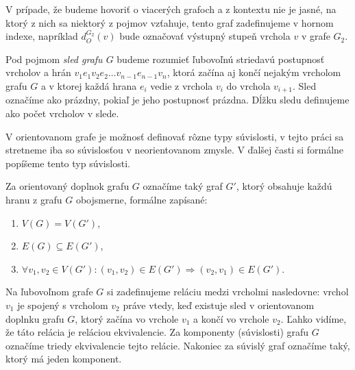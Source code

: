 V prípade, že budeme hovoriť o viacerých grafoch a z kontextu nie je jasné, na ktorý z nich
sa niektorý z pojmov vzťahuje, tento graf zadefinujeme v hornom indexe, napríklad
$d_O^{G_2}(v)$ bude označovať výstupný stupeň vrchola $v$ v grafe $G_2$.

Pod pojmom \emph{sled grafu $G$} budeme rozumieť ľubovoľnú striedavú postupnosť vrcholov
a hrán $v_1 e_1 v_2 e_2 \ldots v_{n-1} e_{n-1} v_n$, ktorá začína aj končí nejakým vrcholom
grafu $G$ a v ktorej každá hrana $e_i$ vedie z vrchola $v_i$ do vrchola $v_{i+1}$. Sled označíme
ako prázdny, pokiaľ je jeho postupnosť prázdna. Dĺžku sledu definujeme ako počet vrcholov v slede.

V orientovanom grafe je možnosť definovať rôzne typy súvislosti, v tejto práci sa stretneme iba
so súvislosťou v neorientovanom zmysle. V ďalšej časti si formálne popíšeme tento typ súvislosti.

Za orientovaný doplnok grafu $G$ označíme taký graf $G'$,
ktorý obsahuje každú hranu z grafu $G$ obojsmerne, formálne zapísané:
\begin{enumerate}
    \item $V(G) = V(G')$,
    \item $E(G) \subseteq E(G')$,
    \item $\forall v_1, v_2 \in V(G') : (v_1, v_2) \in E(G') \Rightarrow (v_2, v_1) \in E(G')$.
\end{enumerate}

Na ľubovoľnom grafe $G$ si zadefinujeme reláciu medzi vrcholmi nasledovne: vrchol $v_1$ je spojený
s vrcholom $v_2$ práve vtedy, keď existuje sled v orientovanom doplnku grafu $G$, ktorý začína vo 
vrchole $v_1$ a končí vo vrchole $v_2$. Ľahko vidíme, že táto relácia je reláciou ekvivalencie.
Za komponenty (súvislosti) grafu $G$ označíme triedy ekvivalencie tejto relácie. Nakoniec za súvislý graf
označíme taký, ktorý má jeden komponent.



